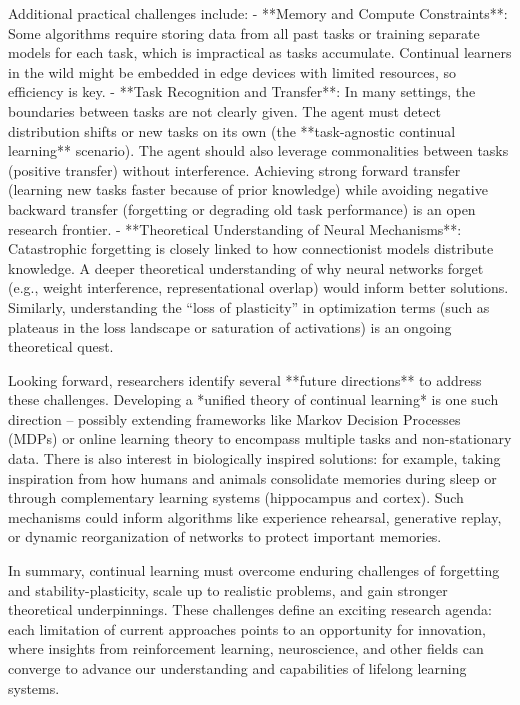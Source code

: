 Additional practical challenges include:
- **Memory and Compute Constraints**: Some algorithms require storing data from all past tasks or training separate models for each task, which is impractical as tasks accumulate. Continual learners in the wild might be embedded in edge devices with limited resources, so efficiency is key.
- **Task Recognition and Transfer**: In many settings, the boundaries between tasks are not clearly given. The agent must detect distribution shifts or new tasks on its own (the **task-agnostic continual learning** scenario). The agent should also leverage commonalities between tasks (positive transfer) without interference. Achieving strong forward transfer (learning new tasks faster because of prior knowledge) while avoiding negative backward transfer (forgetting or degrading old task performance) is an open research frontier.
- **Theoretical Understanding of Neural Mechanisms**: Catastrophic forgetting is closely linked to how connectionist models distribute knowledge. A deeper theoretical understanding of why neural networks forget (e.g., weight interference, representational overlap) would inform better solutions. Similarly, understanding the “loss of plasticity” in optimization terms (such as plateaus in the loss landscape or saturation of activations) is an ongoing theoretical quest.

Looking forward, researchers identify several **future directions** to address these challenges. Developing a *unified theory of continual learning* is one such direction – possibly extending frameworks like Markov Decision Processes (MDPs) or online learning theory to encompass multiple tasks and non-stationary data. There is also interest in biologically inspired solutions: for example, taking inspiration from how humans and animals consolidate memories during sleep or through complementary learning systems (hippocampus and cortex). Such mechanisms could inform algorithms like experience rehearsal, generative replay, or dynamic reorganization of networks to protect important memories.

In summary, continual learning must overcome enduring challenges of forgetting and stability-plasticity, scale up to realistic problems, and gain stronger theoretical underpinnings. These challenges define an exciting research agenda: each limitation of current approaches points to an opportunity for innovation, where insights from reinforcement learning, neuroscience, and other fields can converge to advance our understanding and capabilities of lifelong learning systems.

